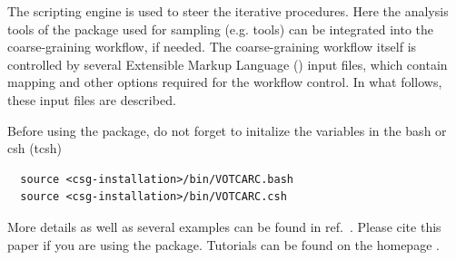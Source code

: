 The scripting engine is used to steer the iterative procedures. Here the analysis tools of the package used for sampling (e.g. \gromacs tools) can be integrated into the coarse-graining workflow, if needed. The coarse-graining workflow itself is controlled by several Extensible Markup Language (\xml) input files, which contain mapping and other options required for the workflow control. In what follows, these input files are described.

Before using the package, do not forget to initalize the variables in the bash or csh (tcsh)
\begin{verbatim}
  source <csg-installation>/bin/VOTCARC.bash
  source <csg-installation>/bin/VOTCARC.csh
\end{verbatim}

More details as well as several examples can be found in ref.~\cite{Ruehle:2009.a}. Please cite this paper if you are using the package. Tutorials can be found on the \votca homepage \votcaweb.
